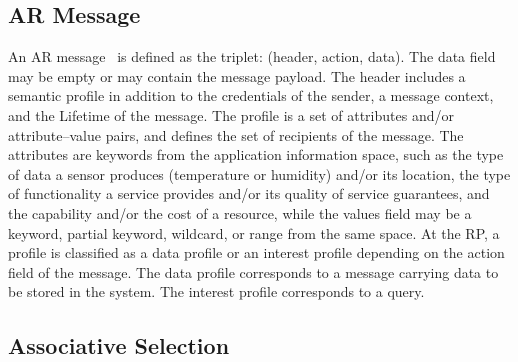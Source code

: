\subsection{AR Message}
An AR message~\cite{meteor2008} is defined as the triplet: (header, action, data). The data field may be empty or may contain the message payload. The header includes a semantic profile in addition to the credentials of the sender, a message context, and the Lifetime of the message. The profile is a set of attributes and/or attribute–value pairs, and defines the set of recipients of the message. The attributes are keywords from the application information space, such as the type of data a sensor produces (temperature or humidity) and/or its location, the type of functionality a service provides and/or its quality of service guarantees, and the capability and/or the cost of a resource, while the values field may be a keyword, partial keyword, wildcard, or range from the same space. At the RP, a profile is classified as a data profile or an interest profile depending on the action field of the message. The data profile corresponds to a message carrying data to be stored in the system. The interest profile corresponds to a query.

\subsection{Associative Selection} 

